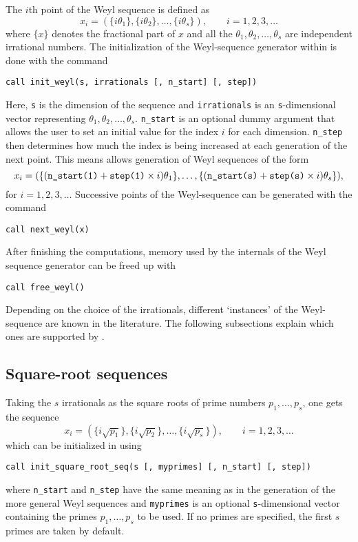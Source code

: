 The $i$th point of the Weyl sequence \cite{weyl16} is defined as
\[
x_i = ( \{i\theta_1\}, \{i\theta_2\}, \ldots, \{i\theta_s\} ),
 \qquad i=1,2,3,\dots
\]
where $\{x\}$ denotes the fractional part of $x$ and all the $\theta_1,
\theta_2,\ldots,\theta_s$ are independent irrational numbers.
The initialization of the Weyl-sequence generator within \qmcpack{} is done with
the command
\begin{lstlisting}
call init_weyl(s, irrationals [, n_start] [, step])
\end{lstlisting}
Here, \verb!s! is the dimension of the sequence and \verb!irrationals! is an
\verb!s!-dimensional vector representing $\theta_1, \theta_2,\dots,\theta_s$.
\verb!n_start! is an optional dummy argument that allows the user to set an
initial value for the index $i$ for each dimension.  \verb!n_step! then
determines how much the index is being increased at each generation of the next
point.  This means \qmcpack{} allows generation of Weyl sequences of the form
\[
x_i = ( \{(\verb!n_start(1)!+\verb!step(1)!\times i)\theta_1\}, \ldots, \{(\verb!n_start(s)!+\verb!step(s)!\times i)\theta_s\}),
\]
for $i=1,2,3,\ldots$  Successive points of the Weyl-sequence can be generated with the command
\begin{lstlisting}
call next_weyl(x)
\end{lstlisting}
%
After finishing the computations, memory used by the internals of the Weyl
sequence generator can be freed up with
\begin{lstlisting}
call free_weyl()
\end{lstlisting}
%
Depending on the choice of the irrationals, different `instances' of the
Weyl-sequence are known in the literature.  The following subsections explain
which ones are supported by \qmcpack{}.

\subsection{Square-root sequences}

Taking the $s$ irrationals as the square roots of prime numbers
$p_1, \ldots, p_s$, one gets the sequence
\[
x_i = ( \{i\sqrt{p_1}\}, \{i\sqrt{p_2}\}, \ldots, \{i\sqrt{p_s}\} ),
 \qquad i=1,2,3,\ldots
\]
which can be initialized in \qmcpack{} using
\begin{lstlisting}
call init_square_root_seq(s [, myprimes] [, n_start] [, step])
\end{lstlisting}
where \verb!n_start! and \verb!n_step! have the same meaning as in the
generation of the more general Weyl sequences and \verb!myprimes! is an optional
\verb!s!-dimensional vector containing the primes $p_1, \ldots, p_s$ to be used.
If no primes are specified, the first $s$ primes are taken by default.

